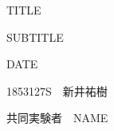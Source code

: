 \documentclass[a4paper]{ltjsarticle}
\title{}
\author{1853127S 新井祐樹}
\date{\Filemodtoday{\jobname}}
\numberwithin{equation}{section}
\begin{document}
\begin{center}
    \huge TITLE\par
    \vspace{15mm}
    \LARGE SUBTITLE \par
    \vspace{150mm}
    \Large DATE \par
    \vspace{15mm}
    \Large 1853127S　新井祐樹 \par
    \vspace{10mm}
    \Large 共同実験者　NAME
    \vspace{10mm}
\end{center}
\thispagestyle{empty}
\clearpage
\addtocounter{page}{-1}
%
%
%
%
\end{document}

